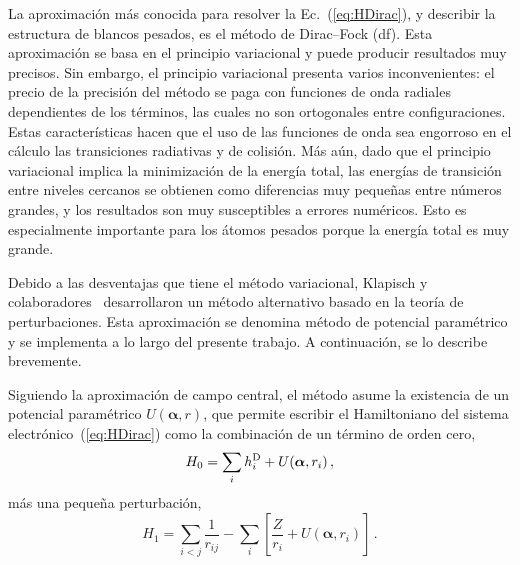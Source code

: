 La aproximación más conocida para resolver la Ec.~(\ref{eq:HDirac}), y 
describir la estructura de blancos pesados, es el método de 
Dirac--Fock (\acs{df}). Esta aproximación se basa en el principio 
variacional y puede producir resultados muy precisos. Sin embargo, el 
principio variacional presenta varios inconvenientes: el precio de la 
precisión del método se paga con funciones de onda radiales dependientes 
de los términos, las cuales no son ortogonales entre configuraciones. 
Estas características hacen que el uso de las funciones de onda sea 
engorroso en el cálculo las transiciones radiativas y de colisión. Más 
aún, dado que el principio variacional implica la minimización de la 
energía total, las energías de transición entre niveles cercanos se 
obtienen como diferencias muy pequeñas entre números grandes, y los 
resultados son muy susceptibles a errores numéricos. Esto es 
especialmente importante para los átomos pesados porque la energía total 
es muy grande. 

Debido a las desventajas que tiene el método variacional, Klapisch y 
colaboradores~\cite{Klapisch:71,Klapisch:67,Klapisch:77,BarShalom:01}
desarrollaron un método alternativo basado en la teoría de 
perturbaciones. Esta aproximación se denomina método de potencial 
paramétrico y se implementa a lo largo del presente trabajo. A 
continuación, se lo describe brevemente. 

Siguiendo la aproximación de campo central, el método asume la 
existencia de un potencial paramétrico $U(\boldsymbol{\alpha},r)$, que 
permite escribir el Hamiltoniano del sistema 
electrónico~(\ref{eq:HDirac}) como la combinación de un término de orden 
cero,
\begin{equation}
 H_0 = \sum_i h_i^{\mbox{\scriptsize D}} + U(\boldsymbol{\alpha},r_i)\,,
\end{equation}
más una pequeña perturbación,
\begin{equation}
 H_1 = \sum_{i<j}\frac{1}{r_{ij}}
 - \sum_i \left[ \frac{Z}{r_i} + U(\boldsymbol{\alpha},r_i) \right]\,.
\end{equation}

